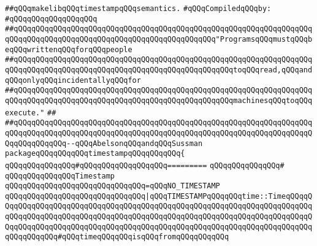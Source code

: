 \label{src/app/makelib/paths/timestamp.pkg}
\verb|##qQQqmakelibqQQqtimestampqQQqsemantics.|\newline
\newline
\verb|#qQQqCompiledqQQqby:|\newline
\verb|#qQQqqQQqqQQqqQQqqQQq|\newline
\newline
\newline
\newline
\verb|##qQQqqQQqqQQqqQQqqQQqqQQqqQQqqQQqqQQqqQQqqQQqqQQqqQQqqQQqqQQqqQQqqQQqqQQqqQQqqQQqqQQqqQQqqQQqqQQqqQQqqQQqqQQqqQQqqQQq"ProgramsqQQqmustqQQqbeqQQqwrittenqQQqforqQQqpeople|\newline
\verb|##qQQqqQQqqQQqqQQqqQQqqQQqqQQqqQQqqQQqqQQqqQQqqQQqqQQqqQQqqQQqqQQqqQQqqQQqqQQqqQQqqQQqqQQqqQQqqQQqqQQqqQQqqQQqqQQqqQQqqQQqtoqQQqread,qQQqandqQQqonlyqQQqincidentallyqQQqfor|\newline
\verb|##qQQqqQQqqQQqqQQqqQQqqQQqqQQqqQQqqQQqqQQqqQQqqQQqqQQqqQQqqQQqqQQqqQQqqQQqqQQqqQQqqQQqqQQqqQQqqQQqqQQqqQQqqQQqqQQqqQQqqQQqmachinesqQQqtoqQQqexecute."|\newline
\verb|##|\newline
\verb|##qQQqqQQqqQQqqQQqqQQqqQQqqQQqqQQqqQQqqQQqqQQqqQQqqQQqqQQqqQQqqQQqqQQqqQQqqQQqqQQqqQQqqQQqqQQqqQQqqQQqqQQqqQQqqQQqqQQqqQQqqQQqqQQqqQQqqQQqqQQqqQQqqQQqqQQq--qQQqAbelsonqQQqandqQQqSussman|\newline
\newline
\newline
\newline
\verb|packageqQQqqQQqqQQqtimestampqQQqqQQqqQQq{|\newline
\verb|qQQqqQQqqQQqqQQq#qQQqqQQqqQQqqQQqqQQq=========|\newline
\verb|qQQqqQQqqQQqqQQq#|\newline
\verb|qQQqqQQqqQQqqQQqTimestamp|\newline
\verb|qQQqqQQqqQQqqQQqqQQqqQQqqQQqqQQq=qQQqNO_TIMESTAMP|\newline
\verb|qQQqqQQqqQQqqQQqqQQqqQQqqQQqqQQq|\verb#|qQQqTIMESTAMPqQQqqQQqtime::TimeqQQqqQQqqQQqqQQqqQQqqQQqqQQqqQQqqQQqqQQqqQQqqQQqqQQqqQQqqQQqqQQqqQQqqQQqqQQqqQQqqQQqqQQqqQQqqQQqqQQqqQQqqQQqqQQqqQQqqQQqqQQqqQQqqQQqqQQqqQQqqQQqqQQqqQQqqQQqqQQqqQQqqQQqqQQqqQQqqQQqqQQqqQQqqQQqqQQqqQQqqQQqqQQqqQQqqQQqqQQqqQQqqQQq#\verb|#qQQqtimeqQQqqQQqisqQQqfromqQQqqQQqqQQq|\newline
